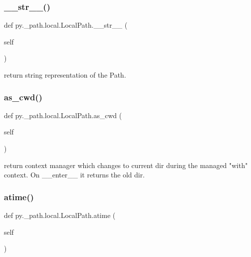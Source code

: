 \subsubsection{\texorpdfstring{\+\_\+\+\_\+str\+\_\+\+\_\+()}{\_\_str\_\_()}}
{\footnotesize\ttfamily def py.\+\_\+path.\+local.\+Local\+Path.\+\_\+\+\_\+str\+\_\+\+\_\+ (\begin{DoxyParamCaption}\item[{}]{self }\end{DoxyParamCaption})}

\begin{DoxyVerb}return string representation of the Path. \end{DoxyVerb}
 \mbox{\label{classpy_1_1__path_1_1local_1_1_local_path_ad234257857ec631f4f4bf6a136a9ed05}} 
\subsubsection{\texorpdfstring{as\+\_\+cwd()}{as\_cwd()}}
{\footnotesize\ttfamily def py.\+\_\+path.\+local.\+Local\+Path.\+as\+\_\+cwd (\begin{DoxyParamCaption}\item[{}]{self }\end{DoxyParamCaption})}

\begin{DoxyVerb}return context manager which changes to current dir during the
managed "with" context. On __enter__ it returns the old dir.
\end{DoxyVerb}
 \mbox{\label{classpy_1_1__path_1_1local_1_1_local_path_aae320d9796d03dacedac2fca54d77239}} 
\subsubsection{\texorpdfstring{atime()}{atime()}}
{\footnotesize\ttfamily def py.\+\_\+path.\+local.\+Local\+Path.\+atime (\begin{DoxyParamCaption}\item[{}]{self }\end{DoxyParamCaption})}

